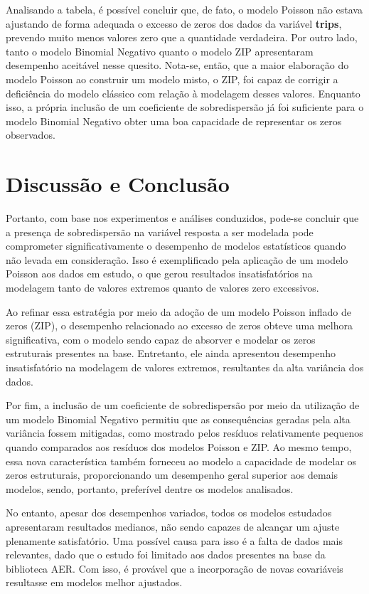 \documentclass[
  twocolumn]{article}
\begin{document}
Analisando a tabela, é possível concluir que, de fato, o modelo Poisson
não estava ajustando de forma adequada o excesso de zeros dos dados da
variável \textbf{trips}, prevendo muito menos valores zero que a
quantidade verdadeira. Por outro lado, tanto o modelo Binomial Negativo
quanto o modelo ZIP apresentaram desempenho aceitável nesse quesito.
Nota-se, então, que a maior elaboração do modelo Poisson ao construir um
modelo misto, o ZIP, foi capaz de corrigir a deficiência do modelo
clássico com relação à modelagem desses valores. Enquanto isso, a
própria inclusão de um coeficiente de sobredispersão já foi suficiente
para o modelo Binomial Negativo obter uma boa capacidade de representar
os zeros observados.

\section{Discussão e Conclusão}\label{discussuxe3o-e-conclusuxe3o}

Portanto, com base nos experimentos e análises conduzidos, pode-se
concluir que a presença de sobredispersão na variável resposta a ser
modelada pode comprometer significativamente o desempenho de modelos
estatísticos quando não levada em consideração. Isso é exemplificado
pela aplicação de um modelo Poisson aos dados em estudo, o que gerou
resultados insatisfatórios na modelagem tanto de valores extremos quanto
de valores zero excessivos.

Ao refinar essa estratégia por meio da adoção de um modelo Poisson
inflado de zeros (ZIP), o desempenho relacionado ao excesso de zeros
obteve uma melhora significativa, com o modelo sendo capaz de absorver e
modelar os zeros estruturais presentes na base. Entretanto, ele ainda
apresentou desempenho insatisfatório na modelagem de valores extremos,
resultantes da alta variância dos dados.

Por fim, a inclusão de um coeficiente de sobredispersão por meio da
utilização de um modelo Binomial Negativo permitiu que as consequências
geradas pela alta variância fossem mitigadas, como mostrado pelos
resíduos relativamente pequenos quando comparados aos resíduos dos
modelos Poisson e ZIP. Ao mesmo tempo, essa nova característica também
forneceu ao modelo a capacidade de modelar os zeros estruturais,
proporcionando um desempenho geral superior aos demais modelos, sendo,
portanto, preferível dentre os modelos analisados.

No entanto, apesar dos desempenhos variados, todos os modelos estudados
apresentaram resultados medianos, não sendo capazes de alcançar um
ajuste plenamente satisfatório. Uma possível causa para isso é a falta
de dados mais relevantes, dado que o estudo foi limitado aos dados
presentes na base da biblioteca AER. Com isso, é provável que a
incorporação de novas covariáveis resultasse em modelos melhor
ajustados.
\end{document}
